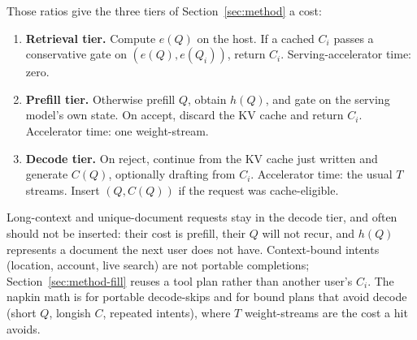 Those ratios give the three tiers of Section~\ref{sec:method} a cost:
\begin{enumerate}
  \item \textbf{Retrieval tier.} Compute $e(Q)$ on the host. If a cached $C_i$ passes a conservative gate on $(e(Q),e(Q_i))$, return $C_i$. Serving-accelerator time: zero.
  \item \textbf{Prefill tier.} Otherwise prefill $Q$, obtain $h(Q)$, and gate on the serving model's own state. On accept, discard the KV cache and return $C_i$. Accelerator time: one weight-stream.
  \item \textbf{Decode tier.} On reject, continue from the KV cache just written and generate $C(Q)$, optionally drafting from $C_i$. Accelerator time: the usual $T$ streams. Insert $(Q,C(Q))$ if the request was cache-eligible.
\end{enumerate}
Long-context and unique-document requests stay in the decode tier, and often should not be inserted: their cost is prefill, their $Q$ will not recur, and $h(Q)$ represents a document the next user does not have. Context-bound intents (location, account, live search) are not portable completions; Section~\ref{sec:method-fill} reuses a tool plan rather than another user's $C_i$. The napkin math is for portable decode-skips and for bound plans that avoid decode (short $Q$, longish $C$, repeated intents), where $T$ weight-streams are the cost a hit avoids.

